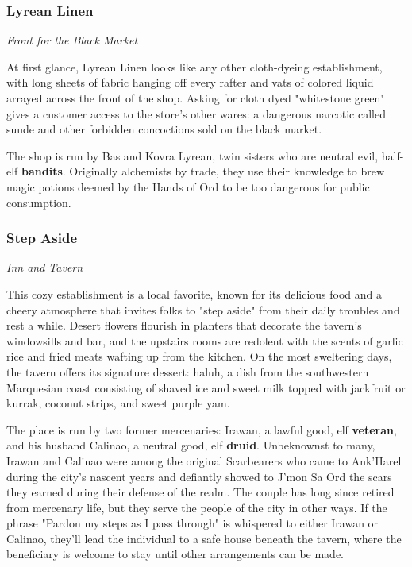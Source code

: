 \documentclass[a4paper, 11pt, bg=full, twocolumn, nooutline]{dndbook}
\begin{document}
\subsubsection{Lyrean Linen}

\textit{Front for the Black Market}

At first glance, Lyrean Linen looks like any other cloth-dyeing establishment, with long sheets of fabric hanging off every rafter and vats of colored liquid arrayed across the front of the shop. Asking for cloth dyed "whitestone green" gives a customer access to the store's other wares: a dangerous narcotic called suude and other forbidden concoctions sold on the black market.

The shop is run by Bas and Kovra Lyrean, twin sisters who are neutral evil, half-elf \textbf{bandits}. Originally alchemists by trade, they use their knowledge to brew magic potions deemed by the Hands of Ord to be too dangerous for public consumption.

\subsubsection{Step Aside}

\textit{Inn and Tavern}

This cozy establishment is a local favorite, known for its delicious food and a cheery atmosphere that invites folks to "step aside" from their daily troubles and rest a while. Desert flowers flourish in planters that decorate the tavern's windowsills and bar, and the upstairs rooms are redolent with the scents of garlic rice and fried meats wafting up from the kitchen. On the most sweltering days, the tavern offers its signature dessert: haluh, a dish from the southwestern Marquesian coast consisting of shaved ice and sweet milk topped with jackfruit or kurrak, coconut strips, and sweet purple yam.

The place is run by two former mercenaries: Irawan, a lawful good, elf \textbf{veteran}, and his husband Calinao, a neutral good, elf \textbf{druid}. Unbeknownst to many, Irawan and Calinao were among the original Scarbearers who came to Ank'Harel during the city's nascent years and defiantly showed to J'mon Sa Ord the scars they earned during their defense of the realm. The couple has long since retired from mercenary life, but they serve the people of the city in other ways. If the phrase "Pardon my steps as I pass through" is whispered to either Irawan or Calinao, they'll lead the individual to a safe house beneath the tavern, where the beneficiary is welcome to stay until other arrangements can be made.
\end{document}
